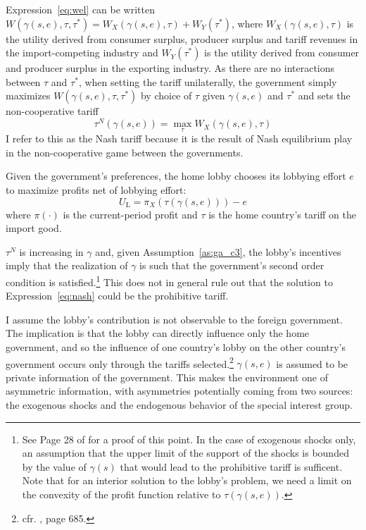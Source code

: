 \documentclass[12pt]{article}
\newcommand{\ga}{\gamma}
\begin{document}
Expression~\ref{eq:wel} can be written $W(\ga(s,e),\tau,\tau^*) = W_X(\ga(s,e),\tau) +W_Y(\tau^*)$, where $W_X(\ga(s,e),\tau)$ is the utility derived from consumer surplus, producer surplus and tariff revenues in the import-competing industry and $W_Y(\tau^*)$ is the utility derived from consumer and producer surplus in the exporting industry. As there are no interactions between $\tau$ and $\tau^*$, when setting the tariff unilaterally, the government simply maximizes $W(\ga(s,e),\tau, \tau^*)$ by choice of $\tau$ given $\ga(s,e)$ and $\tau^*$ and sets the non-cooperative tariff
\begin{equation}
  \tau^N(\ga(s,e)) = \max_\tau W_X(\ga(s,e),\tau)
  \label{eq:nash}
\end{equation}
I refer to this as the Nash tariff because it is the result of Nash equilibrium play in the non-cooperative game between the governments. 

Given the government's preferences, the home lobby chooses its lobbying effort $e$ to maximize profits net of lobbying effort:
\begin{equation}
  U_\text{L} = \pi_X(\tau(\ga(s,e))) - e
  \label{eq:lv3}
\end{equation}
where $\pi(\cdot)$ is the current-period profit and $\tau$ is the home country's tariff on the import good.

$\tau^N$ is increasing in $\ga$ and, given Assumption~\ref{as:ga_c3}, the lobby's incentives imply that the realization of $\ga$ is such that the government's second order condition is satisfied.\footnote{See Page 28 of \Textcite{buzard2013b} for a proof of this point. In the case of exogenous shocks only, an assumption that the upper limit of the support of the shocks is bounded by the value of $\ga(s)$ that would lead to the prohibitive tariff is sufficent. Note that for an interior solution to the lobby's problem, we need a limit on the convexity of the profit function relative to $\tau(\ga(s,e))$.} This does not in general rule out that the solution to Expression~\ref{eq:nash} could be the prohibitive tariff.

I assume the lobby's contribution is not observable to the foreign government. The implication is that the lobby can directly influence only the home government, and so the influence of one country's lobby on the other country's government occurs only through the tariffs selected.\footnote{cfr. \Textcite{gh95}, page 685.} $\ga(s,e)$ is assumed to be private information of the government. This makes the environment one of asymmetric information, with asymmetries potentially coming from two sources: the exogenous shocks and the endogenous behavior of the special interest group.
\end{document}
